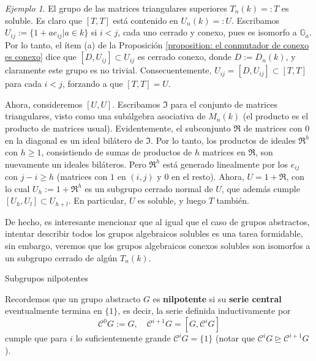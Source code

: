 \documentclass[spanish,12pt]{amsart}
\makeatletter
\renewcommand\subsection{\@startsection{subsection}{2}%
  \z@{.5\linespacing\@plus.7\linespacing}{-.5em}%
  {\normalfont\sffamily}}
\theoremstyle{definition}
\theoremstyle{remark}
\newtheorem{example}[theorem]{Ejemplo}
\numberwithin{equation}{section}
\makeatother
\begin{document}
\begin{example}\label{example:matrices triangulares superiores es soluble y el de las matrices unipontentes es nilpotente}
El grupo de las matrices triangulares superiores $T_n (k)=:T$ es soluble. Es claro que $[T,T]$ está contenido en $U_n (k) =: U$. Escribamos $U_{ij} := \{1 + ae_{ij} | a \in k\}$ si $i < j$, cada uno cerrado y conexo, pues es isomorfo a $\mathbb{G}_a$. Por lo tanto, el ítem (a) de la Proposición \ref{proposition: el conmutador de conexo es conexo} dice que $[D, U_{ij}] \subset U_{ij}$ es cerrado conexo, donde $D := D_n (k)$, y claramente este grupo es no trivial. Consecuentemente, $U_{ij} = [D, U_{ij}] \subset [T,T]$ para cada $i<j$, forzando a que $[T,T] = U$.

Ahora, consideremos $[U,U]$. Escribamos $\mathfrak I$ para el conjunto de matrices triangulares, visto como una subálgebra asociativa de $M_n (k)$ (el producto es el producto de matrices usual). Evidentemente, el subconjunto $\mathfrak R$ de matrices con $0$ en la diagonal es un ideal bilátero de $\mathfrak I$. Por lo tanto, los productos de ideales $\mathfrak R^h$ con $h \geq 1$, consistiendo de sumas de productos de $h$ matrices en $\mathfrak R$, son nuevamente un ideales biláteros. Pero $\mathfrak R^h$ está generado linealmente por los $e_{ij}$ con $j - i \geq h$ (matrices con $1$ en $(i,j)$ y $0$ en el resto). Ahora, $U = 1 + \mathfrak R$, con lo cual $U_h := 1 + \mathfrak R^h$ es un subgrupo cerrado normal de $U$, que además cumple $[U_h, U_l] \subset U_{h+ l}$. En particular, $U$ es soluble, y luego $T$ también.
\end{example}

De hecho, es interesante mencionar que al igual que el caso de grupos abstractos, intentar describir todos los grupos algebraicos solubles es una tarea formidable, sin embargo, veremos que los grupos algebraicos conexos solubles son isomorfos a un subgrupo cerrado de algún $T_n (k)$.


\subsection{Subgrupos nilpotentes}


Recordemos que un grupo abstracto $G$ es \textbf{nilpotente} si su \textbf{serie central} eventualmente termina en $\{1\}$, es decir, la serie definida inductivamente por
\[
    \mathcal C ^0 G :=G, \quad \mathcal C^{i + 1} G = [ G, \mathcal C^i G]
\]
cumple que para $i$ lo suficientemente grande $\mathcal C^i G = \{1\}$ (notar que $\mathcal C ^i G \unrhd \mathcal C^{i + 1} G$).
\end{document}
